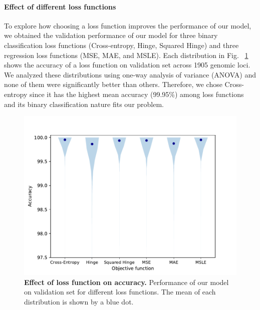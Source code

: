 \paragraph{Effect of different loss functions}
To explore how choosing a loss function improves the performance of our model, we obtained the validation performance of our model for three binary classification loss functions (Cross-entropy, Hinge, Squared Hinge) and three regression loss functions (MSE, MAE, and MSLE). Each distribution in Fig. ~\ref{fig:loss_function} shows the accuracy of a loss function on validation set across 1905 genomic loci. We analyzed these distributions using one-way analysis of variance (ANOVA) and none of them were significantly better than others. Therefore, we chose Cross-entropy since it has the highest mean accuracy (99.95\%) among loss functions and its binary classification nature fits our problem.
\begin{figure}[!ht]
\vskip -0.11in
\begin{center}
\centerline{\includegraphics[width=\columnwidth]{fig/loss_function.pdf}}
\caption{\footnotesize{\bf Effect of loss function on accuracy.}
 Performance of our model on validation set for different loss functions. The mean of each distribution is shown by a blue dot.}
  \label{fig:loss_function}
\end{center}
\vspace{-0.3in}
\end{figure}

